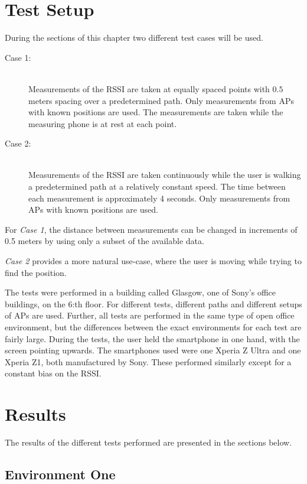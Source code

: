 \documentclass{LTHthesis}
\begin{document}
%
\section{Test Setup}
\label{sec:test_setup}
%
During the sections of this chapter two different test cases will be used.
\begin{description}
%
\item[Case 1:] \hfill \\
%
Measurements of the RSSI are taken at equally spaced points with $0.5$ meters spacing over a predetermined path. Only measurements from APs with known positions are used. The measurements are taken while the measuring phone is at rest at each point.  
%
\item[Case 2:] \hfill \\
%
Measurements of the RSSI are taken continuously while the user is walking a predetermined path at a relatively constant speed. The time between each measurement is approximately 4 seconds. Only measurements from APs with known positions are used.  
%
\end{description}
%
For \emph{Case 1}, the distance between measurements can be changed in increments of 0.5 meters by using only a subset of the available data. 

\emph{Case 2} provides a more natural use-case, where the user is moving while trying to find the position.

The tests were performed in a building called Glasgow, one of Sony's office buildings, on the 6:th floor. For different tests, different paths and different setups of APs are used. Further, all tests are performed in the same type of open office environment, but the differences between the exact environments for each test are fairly large. During the tests, the user held the smartphone in one hand, with the screen pointing upwards. The smartphones used were one Xperia Z Ultra and one Xperia Z1, both manufactured by Sony. These performed similarly except for a constant bias on the RSSI.
%
\section{Results}
\label{environment_results}
%
The results of the different tests performed are presented in the sections below. 
%
\subsection{Environment One} 
%
\end{document}
